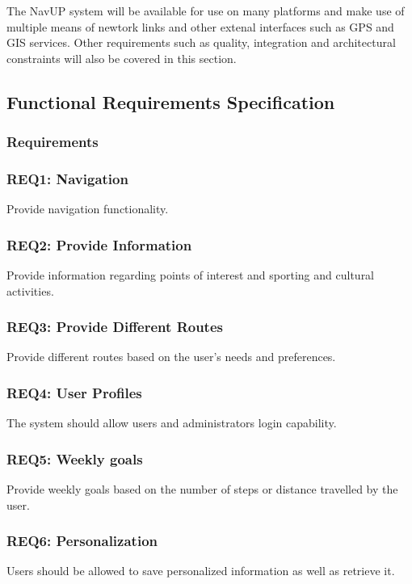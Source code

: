 \documentclass[11pt, a4paper]{article}
\begin{document}
		The NavUP system will be available for use on many platforms and make use of multiple means of newtork links and other extenal interfaces such as GPS and GIS services.
		Other requirements such as quality,  integration and architectural constraints will also be covered in this section.
		
	\subsection{Functional Requirements Specification}
	\subsubsection{Requirements}
		
		\subsubsection {REQ1: Navigation}
			Provide navigation functionality.
			
		\subsubsection {REQ2: Provide Information}
			Provide information regarding points of interest and sporting and cultural activities.
			
		\subsubsection{REQ3: Provide Different Routes}
			Provide different routes based on the user's needs and preferences.
		
		\subsubsection{REQ4: User Profiles}
			The system should allow users and administrators login capability.
			
		\subsubsection{REQ5: Weekly goals}
			Provide weekly goals based on the number of steps or distance travelled by the user.
			
		\subsubsection{REQ6: Personalization}
			Users should be allowed to save personalized information as well as retrieve it.
			
\end{document}
